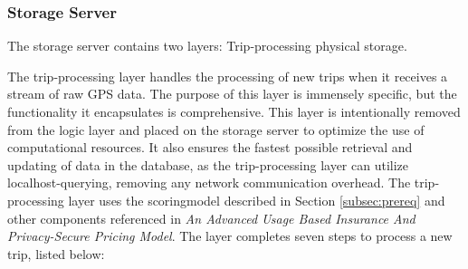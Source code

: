 \subsubsection{Storage Server}\label{subsec:storageserver}
The storage server contains two layers: Trip-processing physical storage.

The trip-processing layer handles the processing of new trips when it receives a stream of raw GPS data. The purpose of this layer is immensely specific, but the functionality it encapsulates is comprehensive. This layer is intentionally removed from the logic layer and placed on the storage server to optimize the use of computational resources. It also ensures the fastest possible retrieval and updating of data in the database, as the trip-processing layer can utilize localhost-querying, removing any network communication overhead. The trip-processing layer uses the scoringmodel described in Section \ref{subsec:prereq} and other components referenced in \textit{An Advanced Usage Based Insurance And Privacy-Secure Pricing Model}\cite{sw9_report}. The layer completes seven steps to process a new trip, listed below:


